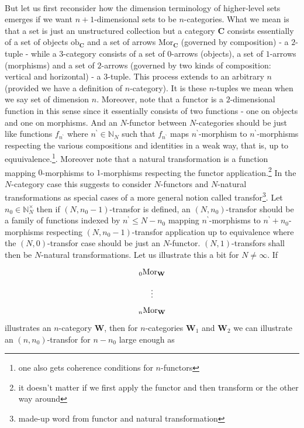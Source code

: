 \\
But let us first reconsider how the dimension terminology of higher-level sets emerges if we want $n+1$-dimensional sets to be $n$-categories. What we mean is that a set is just an unstructured collection but a category $\mathbf{C}$ consists essentially of a set of objects $\mathrm{ob}_{\mathbf{C}}$ and a set of arrows $\mathrm{Mor}_{\mathbf{C}}$ (governed by composition) - a $2$-tuple - while a $3$-category consists of a set of $0$-arrows (objects), a set of $1$-arrows (morphisms) and a set of $2$-arrows (governed by two kinds of composition: vertical and horizontal) - a $3$-tuple. This process extends to an arbitrary $n$ (provided we have a definition of $n$-category). It is these $n$-tuples we mean when we say set of dimension $n$. Moreover, note that a functor is a $2$-dimensional function in this sense since it essentially consists of two functions - one on objects and one on morphisms. And an $N$-functor between $N$-categories should be just like functions $f_{n^{\backprime}}$ where $n^{\backprime} \in \mathbb{N}_{N}$ such that $f_{n^{\backprime}}$ maps $n^{\backprime}$-morphism to $n^{\backprime}$-morphisms respecting the various compositions and identities in a weak way, that is, up to equuivalence.\footnote{one also gets coherence conditions for $n$-functors}. Moreover note that a natural transformation is a function mapping $0$-morphisms to $1$-morphisms respecting the functor application.\footnote{it doesn't matter if we first apply the functor and then transform or the other way around} In the $N$-category case this suggests to consider $N$-functors and $N$-natural transformations as special cases of a more general notion called transfor\footnote{made-up word from functor and natural transformation}. Let $n_{0} \in \mathbb{N}_{N}^{\times}$ then if $(N,n_{0}-1)$-transfor is defined, an $(N,n_{0})$-transfor should be a family of functions indexed by $n^{\backprime} \leq N - n_{0}$ mapping $n^{\backprime}$-morphisms to $n^{\backprime}+n_{0}$-morphisms respecting $(N,n_{0}-1)$-transfor application up to equivalence where the $(N,0)$-transfor case should be just an $N$-functor. $(N,1)$-transfors shall then be $N$-natural transformations. Let us illustrate this a bit for $N \neq \infty$. If
\[
\begin{tikzcd}[sep=tiny]
  {}_{0}\mathrm{Mor}_{\mathbf{W}}
  \\
  \vdots
  \\
  {}_{n}\mathrm{Mor}_{\mathbf{W}}
\end{tikzcd}
\]
illustrates an $n$-category $\mathbf{W}$, then for $n$-categories $\mathbf{W}_{1}$ and $\mathbf{W}_{2}$ we can illustrate an $(n,n_{0})$-transfor for $n-n_{0}$ large enough as
